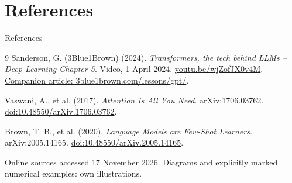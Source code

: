 \documentclass[aspectratio=169,11pt]{beamer}
\begin{document}
\section[References]{References}
\begin{frame}{References}
\small
\begin{thebibliography}{9}
\setlength{\itemsep}{.7em}
Sanderson, G. (3Blue1Brown) (2024).
\newblock \emph{Transformers, the tech behind LLMs -- Deep Learning Chapter 5}.
\newblock Video, 1 April 2024.
\href{https://youtu.be/wjZofJX0v4M}{youtu.be/wjZofJX0v4M}.\\
\href{https://www.3blue1brown.com/lessons/gpt/}{Companion article: 3blue1brown.com/lessons/gpt/}.

Vaswani, A., et al. (2017).
\newblock \emph{Attention Is All You Need}.
\newblock arXiv:1706.03762.
\href{https://doi.org/10.48550/arXiv.1706.03762}{doi:10.48550/arXiv.1706.03762}.

Brown, T. B., et al. (2020).
\newblock \emph{Language Models are Few-Shot Learners}.
\newblock arXiv:2005.14165.
\href{https://doi.org/10.48550/arXiv.2005.14165}{doi:10.48550/arXiv.2005.14165}.
\end{thebibliography}
\medskip
{\scriptsize Online sources accessed 17 November 2026.
Diagrams and explicitly marked numerical examples: own illustrations.}
\end{frame}
\end{document}
